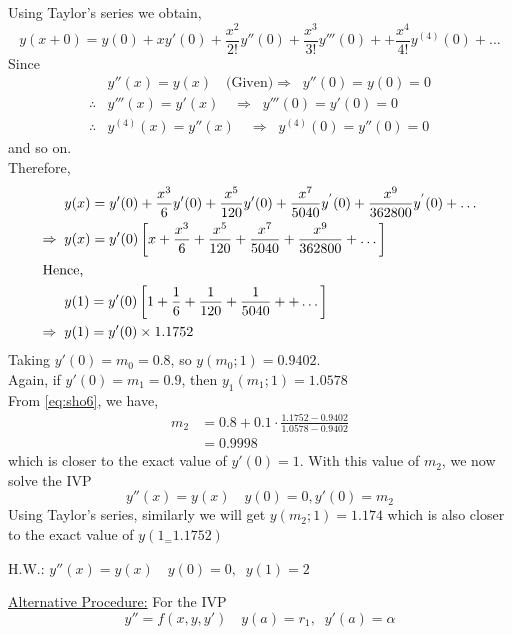 \documentclass[../main-sheet.tex]{subfiles}
\begin{document}
\begin{soln}
    Using Taylor's series we obtain,
    \[y(x+0)=y(0)+xy'(0)+\frac{x^2}{2!}y''(0)+\frac{x^3}{3!}y'''(0)++\frac{x^4}{4!}y^{(4)}(0)+\dots\]
    Since 
    \begin{align*}
        &y''(x)=y(x) \quad \text{(Given)} \Rightarrow\;\; y''(0)=y(0)=0\\
        \therefore&y'''(x)=y'(x) \quad \Rightarrow\;\; y'''(0)=y'(0)=0\\
        \therefore&y^{(4)}(x)=y''(x) \quad \Rightarrow\;\; y^{(4)}(0)=y''(0)=0
    \end{align*}
    and so on.\\
    Therefore,
    \begin{align*}
        & y(x)=y'(0)+\frac{x^3}{6}y'(0)+\frac{x^5}{120}y'(0)+\frac{x^7}{5040}y^{'}(0)+\frac{x^9}{362800}y^{'}(0)+\dots\\
        \Rightarrow\;\;& y(x)=y'(0)\left[x+\frac{x^3}{6}+\frac{x^5}{120}+\frac{x^7}{5040}+\frac{x^9}{362800}+\dots\right]\\
        \intertext{Hence,}
        & y(1)=y'(0)\left[1+\frac{1}{6}+\frac{1}{120}+\frac{1}{5040}++\dots\right]\\
        \Rightarrow\;\;& y(1)=y'(0)\times 1.1752
    \end{align*}
    Taking \(y'(0)=m_0=0.8\), so \(y(m_0;1)=0.9402\).\\
    Again, if \(y'(0)=m_1=0.9\), then \(y_1(m_1;1)=1.0578\)\\
    From \eqref{eq:sho6}, we have,
    \begin{align*}
        m_2&=0.8+0.1\cdot\frac{1.1752-0.9402}{1.0578-0.9402}\\
        &=0.9998
    \end{align*}
    which is closer to the exact value of \(y'(0)=1\). With this value of \(m_2\), we now solve the IVP
    \[y''(x)=y(x)\quad y(0)=0,y'(0)=m_2\]
    Using Taylor's series, similarly we will get \(y(m_2;1)=1.174\) which is also closer to the exact value of \(y(1_=1.1752)\)
\end{soln}
H.W.: \(y''(x)=y(x)\quad y(0)=0,\;\;y(1)=2\)


\underline{Alternative Procedure:} For the IVP
\begin{equation}
    y''=f(x,y,y')\quad y(a)=r_1,\;\;y'(a)=\alpha \label{eq:sho8}
\end{equation}
\end{document}
